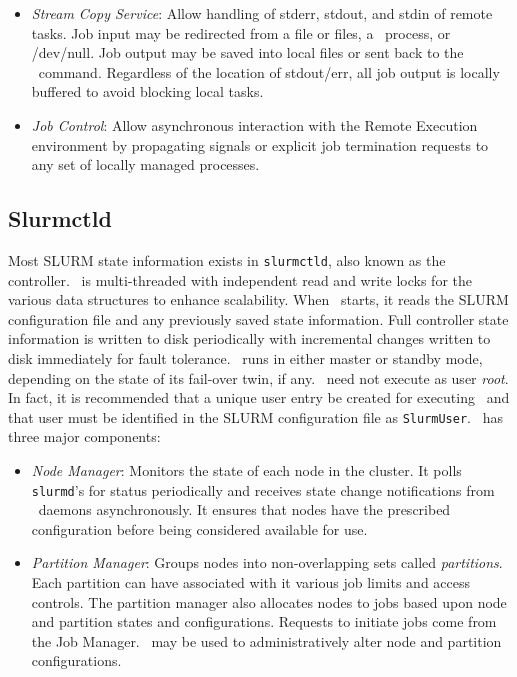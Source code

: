 \documentclass[10pt,onecolumn,times]{../common/llncs}
\begin{document}
{\begin{itemize}
\item {\em Stream Copy Service}: Allow handling of stderr, stdout, and
stdin of remote tasks. Job input may be redirected from a file or files, a
\srun\ process, or /dev/null.  Job output may be saved into local files or
sent back to the \srun\ command. Regardless of the location of stdout/err,
all job output is locally buffered to avoid blocking local tasks.

\item {\em Job Control}: Allow asynchronous interaction with the Remote
Execution environment by propagating signals or explicit job termination
requests to any set of locally managed processes.

\end{itemize}

\subsection{Slurmctld}

Most SLURM state information exists in {\tt slurmctld}, also known as
the controller.  \slurmctld\ is multi-threaded with independent read
and write locks for the various data structures to enhance scalability.
When \slurmctld\ starts, it reads the SLURM configuration file and 
any previously saved state information.  Full controller state
information is written to disk periodically with incremental changes
written to disk immediately for fault tolerance.  \slurmctld\ runs in
either master or standby mode, depending on the state of its fail-over
twin, if any.  \slurmctld\ need not execute as user {\em root}.  In fact,
it is recommended that a unique user entry be created for executing
\slurmctld\ and that user must be identified in the SLURM configuration
file as {\tt SlurmUser}.  \slurmctld\ has three major components:

\begin{itemize}
\item {\em Node Manager}: Monitors the state of each node in the cluster.
It polls {\tt slurmd}'s for status periodically and receives state
change notifications from \slurmd\ daemons asynchronously.  It ensures
that nodes have the prescribed configuration before being considered
available for use.

\item {\em Partition Manager}: Groups nodes into non-overlapping sets
called {\em partitions}. Each partition can have associated with it
various job limits and access controls.  The partition manager also
allocates nodes to jobs based upon node and partition states and
configurations. Requests to initiate jobs come from the Job Manager.
\scontrol\ may be used to administratively alter node and partition
configurations.


\end{itemize}}
\end{document}
